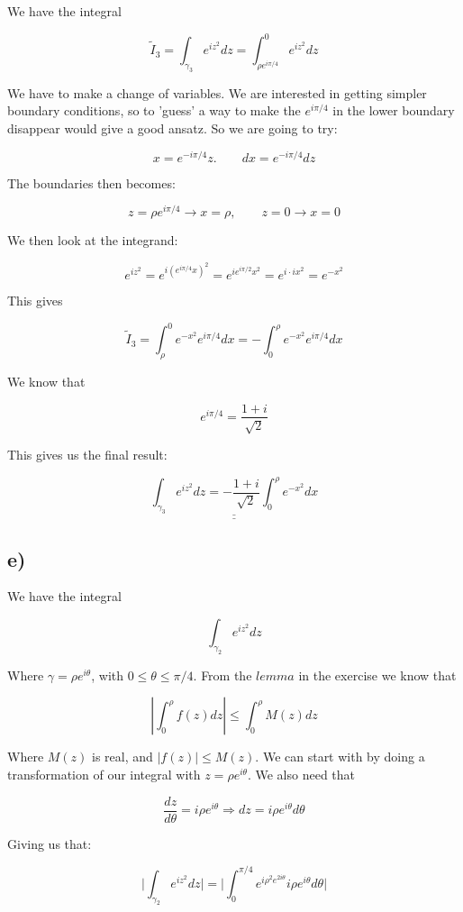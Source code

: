 \documentclass[a4paper,norsk, 10pt]{article}
\begin{document}
We have the integral

$$
\tilde{I}_ 3 = \int_{\gamma_3}e^{iz^2} dz = \int_{\rho e^{i\pi/4}}^0 e^{iz^2} dz 
$$

We have to make a change of variables. We are interested in getting simpler boundary conditions, so to 'guess' a way to make the $e^{i\pi/4}$ in the lower boundary disappear would give a good ansatz. So we are going to try:

$$
x = e^{-i\pi/4}z. \qquad dx = e^{-i\pi /4}dz
$$

The boundaries then becomes:

$$
z = \rho e^{i\pi/4} \rightarrow x = \rho, \qquad z = 0 \rightarrow x = 0
$$

We then look at the integrand:

$$
e^{iz^2} = e^{i(e^{i\pi/4}x)^2} = e^{ie^{i\pi/2}x^2} = e^{i\cdot ix^2} = e^{-x^2}
$$

This gives 

$$
\tilde{I}_3 = \int_{\rho}^0 e^{-x^2} e^{i\pi /4} dx = - \int_0^{\rho} e^{-x^2} e^{i\pi /4} dx
$$

We know that 

$$
e^{i\pi/4} =\frac{1+i}{\sqrt{2}}
$$

This gives us the final result:

\begin{equation}
\underline{\underline{\int_{\gamma_3}e^{iz^2} dz = -\frac{1+i}{\sqrt{2}}\int_0^{\rho}e^{-x^2}dx}}
\label{eq:I3}
\end{equation}



\subsection*{e)}
We have the integral

$$
\int_{\gamma_2}e^{iz^2} dz
$$

Where $\gamma = \rho e^{i\theta}$, with $0 \leq \theta \leq \pi/4$. From the $lemma$ in the exercise we know that

$$
|\int_0^{\rho} f(z) dz| \leq \int_0^{\rho} M(z) dz
$$

Where $M(z)$ is real, and $|f(z)| \leq M(z)$. We can start with by doing a transformation of our integral with $z = \rho e^{i\theta}$. We also need that

$$
\frac{dz}{d\theta} = i\rho e^{i\theta} \Rightarrow dz = i\rho e^{i\theta} d\theta
$$

Giving us that:

$$
\big| \int_{\gamma_2}e^{iz^2} dz \big| = \big|\int_0^{\pi/4} e^{i\rho^2 e^{2i\theta}} i\rho e^{i\theta} d\theta \big|
$$
\end{document}
